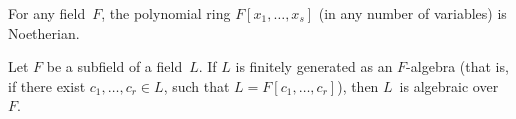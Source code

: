 \begin{prop}
 For any field~$F$, the polynomial ring $F[x_1,\ldots,x_s]$
\textup(in any number of variables\textup) is
Noetherian.
 \end{prop}



\begin{thm} \label{Nullstellensatz-fg}
 Let $F$ be a subfield of a field~$L$. If $L$ is finitely
generated as an $F$-algebra \textup(that is, if there
exist $c_1,\ldots,c_r \in L$, such that $L =
F[c_1,\ldots,c_r]$\textup), then $L$~is algebraic over~$F$.
 \end{thm}

